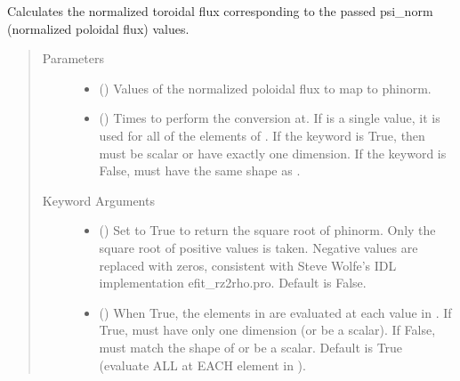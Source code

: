 \documentclass[letterpaper,10pt,english]{sphinxmanual}
\begin{document}
\begin{fulllineitems}
\begin{fulllineitems}
\label{\detokenize{eqtools:eqtools.core.Equilibrium.psinorm2phinorm}}
Calculates the normalized toroidal flux corresponding to the passed psi\_norm (normalized poloidal flux) values.
\begin{quote}\begin{description}
\item[{Parameters}] \leavevmode\begin{itemize}
\item {} 
 () \textendash{} Values of the normalized
poloidal flux to map to phinorm.

\item {} 
 () \textendash{} Times to perform the conversion at.
If  is a single value, it is used for all of the elements of
. If the  keyword is True, then  must be scalar
or have exactly one dimension. If the  keyword is False,
 must have the same shape as .

\end{itemize}

\item[{Keyword Arguments}] \leavevmode\begin{itemize}
\item {} 
 () \textendash{} Set to True to return the square root of phinorm. Only
the square root of positive values is taken. Negative values are
replaced with zeros, consistent with Steve Wolfe’s IDL
implementation efit\_rz2rho.pro. Default is False.

\item {} 
 () \textendash{} When True, the elements in  are evaluated at
each value in . If True,  must have only one dimension (or
be a scalar). If False,  must match the shape of  or be
a scalar. Default is True (evaluate ALL  at EACH element in
).


\end{itemize}
\end{description}
\end{quote}
\end{fulllineitems}
\end{fulllineitems}
\end{document}
